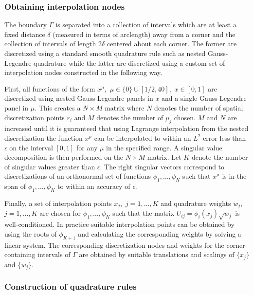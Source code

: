 
\subsubsection{Obtaining interpolation nodes}

The boundary $\Gamma$ is separated into a collection of intervals which are at least a fixed distance $\delta$  (measured in terms of arclength) away from a corner and the collection of intervals of length $2 \delta$ centered about each corner. The former are discretized using a standard smooth quadrature rule such as nested Gauss-Legendre quadrature while the latter are discretized using a custom set of interpolation nodes constructed in the following way.

First, all functions of the form $x^\mu,$ $\mu \in \{0\} \cup [1/2,40],$ $x \in [0,1]$ are discretized using nested Gauss-Legendre panels in $x$ and a single Gauss-Legendre panel in $\mu$. This creates a $N \times M$ matrix where $N$ denotes the number of spatial discretization points $r_i$ and $M$ denotes the number of $\mu_j$ chosen. $M$ and $N$ are increased until it is guaranteed that using Lagrange interpolation from the nested discretization the function $x^\mu$ can be interpolated to within an $L^2$ error less than $\epsilon$ on the interval $[0,1]$ for any $\mu$ in the specified range. A singular value decomposition is then performed on the $N\times M$ matrix. Let $K$ denote the number of singular values greater than $\epsilon.$ The right singular vectors correspond to discretizations of an orthonormal set of functions $\phi_1,\dots,\phi_K$ such that $x^\mu$ is in the span of $\phi_1,\dots,\phi_K$ to within an accuracy of $\epsilon.$

Finally, a set of interpolation points $x_j,$ $j=1,\dots,K$ and quadrature weights $w_j,$ $j=1,\dots,K$ are chosen for $\phi_1,\dots,\phi_K$ such that the matrix $U_{ij} = \phi_i(x_j) \sqrt{w_j}$ is well-conditioned. In practice suitable interpolation points can be obtained by using the roots of $\phi_{K+1}$ and calculating the corresponding weights by solving a linear system. The corresponding discretization nodes and weights for the corner-containing intervals of $\Gamma$ are obtained by suitable translations and scalings of $\{x_j\}$ and $\{w_j\}.$

\subsubsection{Construction of quadrature rules}

